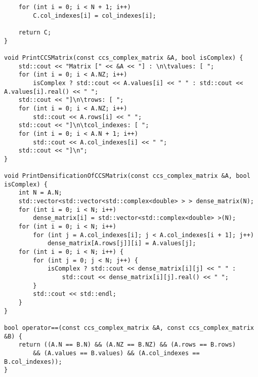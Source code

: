 \documentclass{report}
\begin{document}
\begin{lstlisting}
    for (int i = 0; i < N + 1; i++)
        C.col_indexes[i] = col_indexes[i];

    return C;
}

void PrintCCSMatrix(const ccs_complex_matrix &A, bool isComplex) {
    std::cout << "Matrix [" << &A << "] : \n\tvalues: [ ";
    for (int i = 0; i < A.NZ; i++)
        isComplex ? std::cout << A.values[i] << " " : std::cout << A.values[i].real() << " ";
    std::cout << "]\n\trows: [ ";
    for (int i = 0; i < A.NZ; i++)
        std::cout << A.rows[i] << " ";
    std::cout << "]\n\tcol_indexes: [ ";
    for (int i = 0; i < A.N + 1; i++)
        std::cout << A.col_indexes[i] << " ";
    std::cout << "]\n";
}

void PrintDensificationOfCCSMatrix(const ccs_complex_matrix &A, bool isComplex) {
    int N = A.N;
    std::vector<std::vector<std::complex<double> > > dense_matrix(N);
    for (int i = 0; i < N; i++)
        dense_matrix[i] = std::vector<std::complex<double> >(N);
    for (int i = 0; i < N; i++)
        for (int j = A.col_indexes[i]; j < A.col_indexes[i + 1]; j++)
            dense_matrix[A.rows[j]][i] = A.values[j];
    for (int i = 0; i < N; i++) {
        for (int j = 0; j < N; j++) {
            isComplex ? std::cout << dense_matrix[i][j] << " " :
                std::cout << dense_matrix[i][j].real() << " ";
        }
        std::cout << std::endl;
    }
}

bool operator==(const ccs_complex_matrix &A, const ccs_complex_matrix &B) {
    return ((A.N == B.N) && (A.NZ == B.NZ) && (A.rows == B.rows)
        && (A.values == B.values) && (A.col_indexes == B.col_indexes));
}
	\end{lstlisting}
\end{document}
